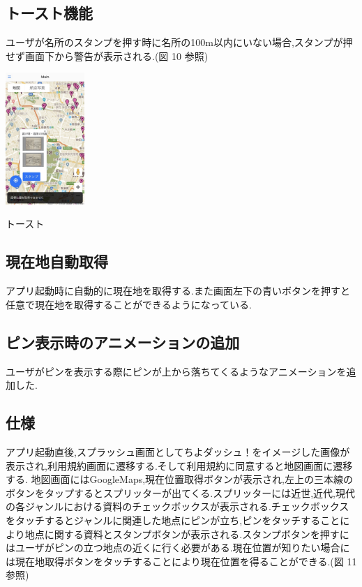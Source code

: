 \documentclass[a4paper, twoside]{jarticle}
\makeatletter
\newenvironment{figurehere}
  {\def\@captype{figure}}
  {}
\makeatother
\begin{document}
\begin{multicols}{2}
\subsection{トースト機能}
ユーザが名所のスタンプを押す時に名所の100m以内にいない場合,スタンプが押せず画面下から警告が表示される.(図 10 参照)
\begin{figurehere}
\begin{center}
\includegraphics[bb=30 50 550 1300,width=3cm]{./image11.jpg}%
\end{center}
\caption{トースト}\label{fig:11}
\end{figurehere}

\subsection{現在地自動取得}
アプリ起動時に自動的に現在地を取得する.また画面左下の青いボタンを押すと任意で現在地を取得することができるようになっている.

\subsection{ピン表示時のアニメーションの追加}
ユーザがピンを表示する際にピンが上から落ちてくるようなアニメーションを追加した.

\subsection{仕様}
アプリ起動直後,スプラッシュ画面としてちよダッシュ！をイメージした画像が表示され,利用規約画面に遷移する.そして利用規約に同意すると地図画面に遷移する.
地図画面にはGoogleMaps,現在位置取得ボタンが表示され,左上の三本線のボタンをタップするとスプリッターが出てくる.スプリッターには近世,近代,現代の各ジャンルにおける資料のチェックボックスが表示される.チェックボックスをタッチするとジャンルに関連した地点にピンが立ち,ピンをタッチすることにより地点に関する資料とスタンプボタンが表示される.スタンプボタンを押すにはユーザがピンの立つ地点の近くに行く必要がある.現在位置が知りたい場合には現在地取得ボタンをタッチすることにより現在位置を得ることができる.(図 11 参照)


\end{multicols}
\end{document}
